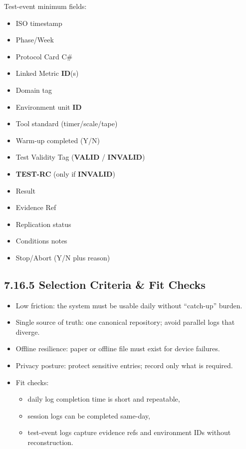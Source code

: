 \documentclass[10pt]{article}
\begin{document}
Test-event minimum fields:

\begin{itemize}
\item ISO timestamp
\item Phase/Week
\item Protocol Card C\#
\item Linked Metric \textbf{ID}(s)
\item Domain tag
\item Environment unit \textbf{ID}
\item Tool standard (timer/scale/tape)
\item Warm-up completed (Y/N)
\item Test Validity Tag (\textbf{VALID} / \textbf{INVALID})
\item \textbf{TEST-RC} (only if \textbf{INVALID})
\item Result
\item Evidence Ref
\item Replication status
\item Conditions notes
\item Stop/Abort (Y/N plus reason)
\end{itemize}

\subsection*{7.16.5 Selection Criteria \& Fit Checks}
{}

\begin{itemize}
\item Low friction: the system must be usable daily without “catch-up” burden.
\item Single source of truth: one canonical repository; avoid parallel logs that diverge.
\item Offline resilience: paper or offline file must exist for device failures.
\item Privacy posture: protect sensitive entries; record only what is required.
\item Fit checks:
  \begin{itemize}
  \item daily log completion time is short and repeatable,
  \item session logs can be completed same-day,
  \item test-event logs capture evidence refs and environment IDs without reconstruction.
  \end{itemize}
\end{itemize}
\end{document}

